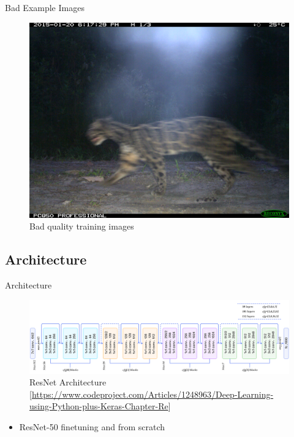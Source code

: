 \documentclass[10pt]{beamer}
\begin{document}
\begin{frame}{Bad Example Images}
\begin{minipage}[c]{0.48\linewidth}
\begin{figure}
			\includegraphics[width=\linewidth,height=\textheight,keepaspectratio]{images/example_bad_DFR_9_female.JPG}
			\caption{Bad quality training images}	
		\end{figure}
	\end{minipage}
\end{frame}

\subsection{Architecture}

\begin{frame}{Architecture}
	\begin{figure}
		\includegraphics[width=\columnwidth]{images/resnet.png}
		\caption{ResNet Architecture\newline{} [\url{https://www.codeproject.com/Articles/1248963/Deep-Learning-using-Python-plus-Keras-Chapter-Re}]}
	\end{figure}

	\begin{itemize}
		\item ResNet-50 finetuning and from scratch
	\end{itemize}
\end{frame}
\end{document}
